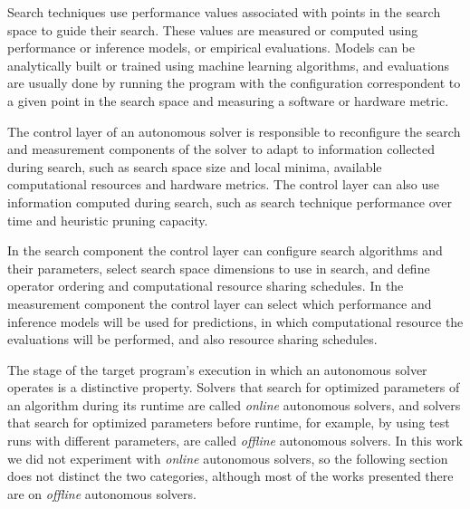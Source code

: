 Search techniques use performance values associated with points in the
search space to guide their search. These values are measured or computed
using performance or inference models, or empirical evaluations.
Models can be analytically built or trained using machine learning
algorithms, and evaluations are usually done by running the program
with the configuration correspondent to a given point in the search
space and measuring a software or hardware metric.

The control layer of an autonomous solver is responsible to reconfigure the
search and measurement components of the solver to adapt to information
collected during search, such as search space size and local minima, available
computational resources and hardware metrics. The control layer can also use
information computed during search, such as search technique performance over
time and heuristic pruning capacity.

In the search component the control layer can configure search algorithms and
their parameters, select search space dimensions to use in search, and define
operator ordering and computational resource sharing schedules.  In the
measurement component the control layer can select which performance and
inference models will be used for predictions, in which computational resource
the evaluations will be performed, and also resource sharing schedules.

The stage of the target program's execution in which an autonomous solver
operates is a distinctive property. Solvers that search for optimized
parameters of an algorithm during its runtime are called \textit{online}
autonomous solvers, and solvers that search for optimized parameters before
runtime, for example, by using test runs with different parameters, are called
\textit{offline} autonomous solvers. In this work we did not experiment with
\textit{online} autonomous solvers, so the following section does not distinct
the two categories, although most of the works presented there are on
\textit{offline} autonomous solvers.

